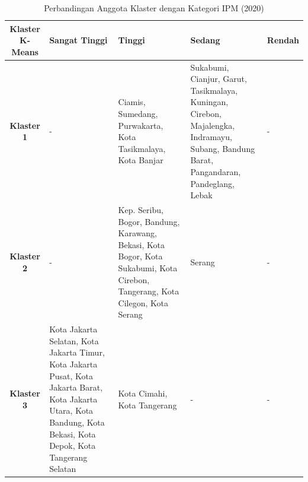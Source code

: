 \begin{table}[H]
\centering
\caption{Perbandingan Anggota Klaster dengan Kategori IPM (2020)} \label{tab:ipm_cross_2020}
\begin{tabular}{|c|p{2cm}|p{2cm}|p{2cm}|p{2cm}|}
\hline
\textbf{Klaster K-Means} & \textbf{Sangat Tinggi} & \textbf{Tinggi} & \textbf{Sedang} & \textbf{Rendah} \\ \hline
\textbf{Klaster 1} & - & Ciamis, Sumedang, Purwakarta, Kota Tasikmalaya, Kota Banjar & Sukabumi, Cianjur, Garut, Tasikmalaya, Kuningan, Cirebon, Majalengka, Indramayu, Subang, Bandung Barat, Pangandaran, Pandeglang, Lebak & - \\ \hline
\textbf{Klaster 2} & - & Kep. Seribu, Bogor, Bandung, Karawang, Bekasi, Kota Bogor, Kota Sukabumi, Kota Cirebon, Tangerang, Kota Cilegon, Kota Serang & Serang & - \\ \hline
\textbf{Klaster 3} & Kota Jakarta Selatan, Kota Jakarta Timur, Kota Jakarta Pusat, Kota Jakarta Barat, Kota Jakarta Utara, Kota Bandung, Kota Bekasi, Kota Depok, Kota Tangerang Selatan & Kota Cimahi, Kota Tangerang & - & - \\ \hline
\end{tabular}
\end{table}